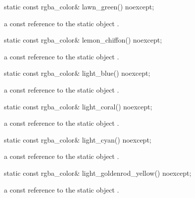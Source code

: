 \begin{itemdecl}
static const rgba_color& lawn_green() noexcept;
\end{itemdecl}
\begin{itemdescr}
\pnum
\returns
a const reference to the static  object .
\end{itemdescr}

\begin{itemdecl}
static const rgba_color& lemon_chiffon() noexcept;
\end{itemdecl}
\begin{itemdescr}
\pnum
\returns
a const reference to the static  object .
\end{itemdescr}

\begin{itemdecl}
static const rgba_color& light_blue() noexcept;
\end{itemdecl}
\begin{itemdescr}
\pnum
\returns
a const reference to the static  object .
\end{itemdescr}

\begin{itemdecl}
static const rgba_color& light_coral() noexcept;
\end{itemdecl}
\begin{itemdescr}
\pnum
\returns
a const reference to the static  object .
\end{itemdescr}

\begin{itemdecl}
static const rgba_color& light_cyan() noexcept;
\end{itemdecl}
\begin{itemdescr}
\pnum
\returns
a const reference to the static  object .
\end{itemdescr}

\begin{itemdecl}
static const rgba_color& light_goldenrod_yellow() noexcept;
\end{itemdecl}
\begin{itemdescr}
\pnum
\returns
a const reference to the static  object .
\end{itemdescr}

